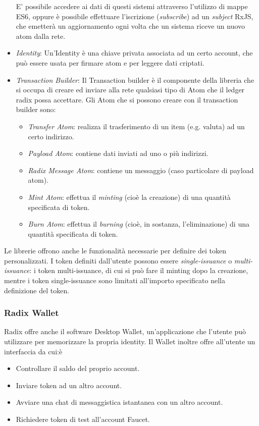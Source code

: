 \begin{itemize}
    E' possibile accedere ai dati di questi sistemi attraverso l'utilizzo di mappe ES6, oppure è possibile effettuare l'iscrizione (\textit{subscribe}) ad un \textit{subject} RxJS, che emetterà un aggiornamento ogni volta che un sistema riceve un nuovo atom dalla rete.
    \item \textit{Identity}: Un'Identity è una chiave privata associata ad un certo account, che può essere usata per firmare atom e per leggere dati criptati.
    \item \textit{Transaction Builder}: Il Transaction builder è il componente della libreria che si occupa di creare ed inviare alla rete qualsiasi tipo di Atom che il ledger radix possa accettare. Gli Atom che si possono creare con il transaction builder sono:
    \begin{itemize}
        \item \textit{Transfer Atom}: realizza il trasferimento di un item (e.g. valuta) ad un certo indirizzo.
        \item \textit{Payload Atom}: contiene dati inviati ad uno o più indirizzi.
        \item \textit{Radix Message Atom}: contiene un messaggio (caso particolare di payload atom).
        \item \textit{Mint Atom}: effettua il \textit{minting} (cioè la creazione) di una quantità specificata di token.
        \item \textit{Burn Atom}: effettua il \textit{burning} (cioè, in sostanza, l'eliminazione) di una quantità specificata di token.
    \end{itemize}
\end{itemize}
Le librerie offrono anche le funzionalità necessarie per definire dei token personalizzati. I token definiti dall'utente possono essere \textit{single-issuance} o \textit{multi-issuance}: i token multi-issuance, di cui si può fare il minting dopo la creazione, mentre i token single-issuance sono limitati all'importo specificato nella definizione del token.

\subsubsection{Radix Wallet}

Radix offre anche il software Desktop Wallet, un'applicazione che l'utente può utilizzare per memorizzare la propria identity. Il Wallet inoltre offre all'utente un interfaccia da cui:è
\begin{itemize}
    \item Controllare il saldo del proprio account.
    \item Inviare token ad un altro account.
    \item Avviare una chat di messaggistica istantanea con un altro account.
    \item Richiedere token di test all'account Faucet.
\end{itemize}